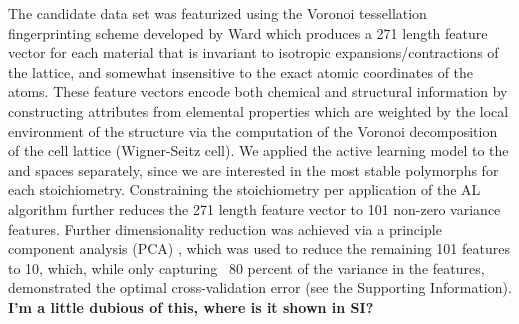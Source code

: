 %
%
The candidate data set was featurized using the Voronoi tessellation fingerprinting scheme developed by Ward  \cite{Ward2017} which produces a \num{271} length feature vector for each material that is invariant to isotropic expansions/contractions of the lattice, and somewhat insensitive to the exact atomic coordinates of the atoms.\cite{Ward2017}
%
These feature vectors encode both chemical and structural information by constructing attributes from elemental properties which are weighted by the local environment of the structure via the computation of the Voronoi decomposition of the cell lattice (Wigner-Seitz cell).
%
We applied the active learning model to the \IrOtwo and \IrOthree spaces separately, since we are interested in the most stable polymorphs for each stoichiometry.
%
Constraining the stoichiometry per application of the AL algorithm further reduces the \num{271} length  feature vector to \num{101} non-zero variance features.%
%
Further dimensionality reduction was achieved via a principle component analysis (PCA) \cite{Tipping1999}, which was used to reduce the remaining \num{101} features to \num{10}, which, while only capturing ~80 percent of the variance in the features, demonstrated the optimal cross-validation error (see the Supporting Information).  \textbf{I'm a little dubious of this, where is it shown in SI?}

